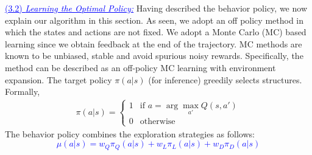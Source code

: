 \noindent \textcolor{blue}{\underline{(3.2) \emph{Learning the Optimal Policy:}}}
Having described the behavior policy, we now explain our algorithm in this section. As seen, we adopt an off policy method in which the states and actions are not fixed. 
We adopt a Monte Carlo (MC) based learning since we obtain feedback at the end of the trajectory. MC methods are known to be unbiased, stable and avoid spurious noisy rewards.
Specifically, the method can be described as an off-policy MC learning with environment expansion.
The target policy $\pi(a|s)$ (for inference) greedily selects structures. 
Formally,
\begin{align}\label{target_policy_eq}
\pi(a|s) = \begin{cases}
  1 & \text{if } a = \arg\max_{a'} Q(s,a') \\ 
  0 & \text{otherwise}
\end{cases}
\end{align}
The behavior policy combines the exploration strategies as follows:
\textcolor{blue}{
\begin{equation*}\label{behavior_policy_eq}
    \mu(a|s) = w_Q \pi_Q(a|s) + w_L \pi_L(a|s) + w_D \pi_D(a|s)
\end{equation*}
}\vspace{-0.5cm}

